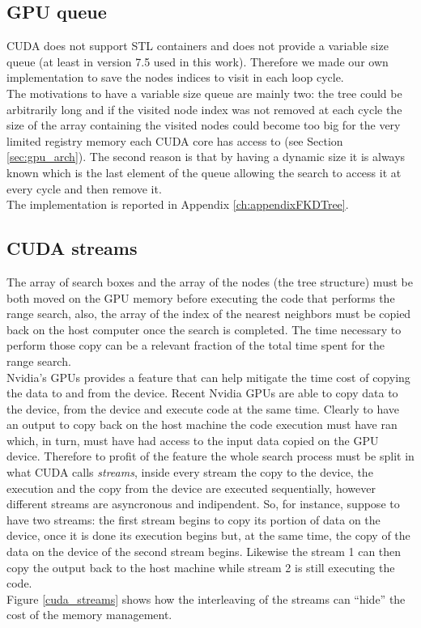 \subsection{GPU queue}
CUDA does not support STL containers and does not provide a variable size queue (at least in version 7.5 used in this work). Therefore we made our own implementation to save the nodes indices to visit in each loop cycle.\\
The motivations to have a variable size queue are mainly two: the tree could be arbitrarily long and if the visited node index was not removed at each cycle the size of the array containing the visited nodes could become too big for the very limited registry memory each CUDA core has access to (see Section \ref{sec:gpu_arch}). The second reason is that by having a dynamic size it is always known which is the last element of the queue allowing the search to access it at every cycle and then remove it.\\
The implementation is reported in Appendix \ref{ch:appendixFKDTree}.

\subsection{CUDA streams}
The array of search boxes and the array of the nodes (the tree structure) must be both moved on the GPU memory before executing the code that performs the range search, also, the array of the index of the nearest neighbors must be copied back on the host computer once the search is completed. The time necessary to perform those copy can be a relevant fraction of the total time spent for the range search.\\
Nvidia's GPUs provides a feature that can help mitigate the time cost of copying the data to and from the device. Recent Nvidia GPUs are able to copy data to the device, from the device and execute code at the same time. Clearly to have an output to copy back on the host machine the code execution must have ran which, in turn, must have had access to the input data copied on the GPU device. Therefore to profit of the feature the whole search process must be split in what CUDA calls \textit{streams}, inside every stream the copy to the device, the execution and the copy from the device are executed sequentially, however different streams are asyncronous and indipendent. So, for instance, suppose to have two streams: the first stream begins to copy its portion of data on the device, once it is done its execution begins but, at the same time, the copy of the data on the device of the second stream begins. Likewise the stream 1 can then copy the output back to the host machine while stream 2 is still executing the code.\\
Figure \ref{cuda_streams} shows how the interleaving of the streams can ``hide'' the cost of the memory management.\\


